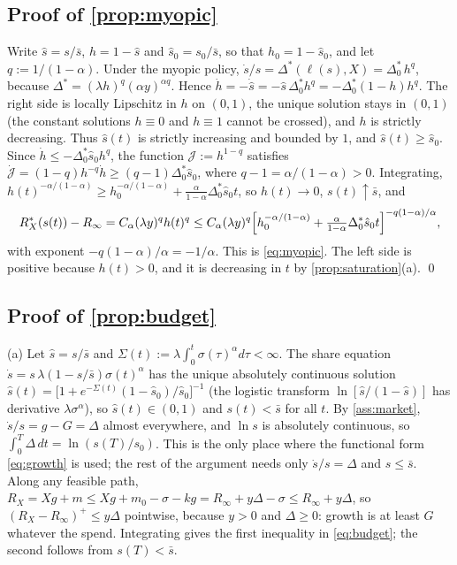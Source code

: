 \subsection*{Proof of \autoref{prop:myopic}}

Write $\hat s=s/\bar s$, $h=1-\hat s$ and $\hat s_0=s_0/\bar s$, so that $h_0=1-\hat s_0$, and let $q:=1/(1-\alpha)$. Under the myopic policy, $\dot s/s=\Delta^*(\ell(s),X)=\Delta_0^*\,h^{q}$, because $\Delta^*=(\lambda h)^{q}(\alpha y)^{\alpha q}$. Hence $\dot h=-\dot{\hat s}=-\hat s\,\Delta_0^*h^{q}=-\Delta_0^*(1-h)h^{q}$. The right side is locally Lipschitz in $h$ on $(0,1)$, the unique solution stays in $(0,1)$ (the constant solutions $h\equiv 0$ and $h\equiv 1$ cannot be crossed), and $h$ is strictly decreasing. Thus $\hat s(t)$ is strictly increasing and bounded by $1$, and $\hat s(t)\ge\hat s_0$. Since $\dot h\le-\Delta_0^*\hat s_0h^{q}$, the function $\mathcal J:=h^{1-q}$ satisfies $\dot{\mathcal J}=(1-q)h^{-q}\dot h\ge(q-1)\Delta_0^*\hat s_0$, where $q-1=\alpha/(1-\alpha)>0$. Integrating, $h(t)^{-\alpha/(1-\alpha)}\ge h_0^{-\alpha/(1-\alpha)}+\tfrac{\alpha}{1-\alpha}\Delta_0^*\hat s_0t$, so $h(t)\to 0$, $s(t)\uparrow\bar s$, and
\[
R_X^*(s(t))-R_\infty=C_\alpha(\lambda y)^{q}h(t)^{q}\le C_\alpha(\lambda y)^{q}\Bigl[h_0^{-\alpha/(1-\alpha)}+\tfrac{\alpha}{1-\alpha}\Delta_0^*\hat s_0t\Bigr]^{-q(1-\alpha)/\alpha},
\]
with exponent $-q(1-\alpha)/\alpha=-1/\alpha$. This is \eqref{eq:myopic}. The left side is positive because $h(t)>0$, and it is decreasing in $t$ by \autoref{prop:saturation}(a). \qed

\subsection*{Proof of \autoref{prop:budget}}

(a) Let $\hat s=s/\bar s$ and $\Sigma(t):=\lambda\int_0^t\sigma(\tau)^{\alpha}d\tau<\infty$. The share equation $\dot s=s\,\lambda(1-s/\bar s)\sigma(t)^{\alpha}$ has the unique absolutely continuous solution $\hat s(t)=\bigl[1+e^{-\Sigma(t)}(1-\hat s_0)/\hat s_0\bigr]^{-1}$ (the logistic transform $\ln[\hat s/(1-\hat s)]$ has derivative $\lambda\sigma^{\alpha}$), so $\hat s(t)\in(0,1)$ and $s(t)<\bar s$ for all $t$. By \autoref{ass:market}, $\dot s/s=g-G=\Delta$ almost everywhere, and $\ln s$ is absolutely continuous, so $\int_0^T\Delta\,dt=\ln(s(T)/s_0)$. This is the only place where the functional form \eqref{eq:growth} is used; the rest of the argument needs only $\dot s/s=\Delta$ and $s\le\bar s$. Along any feasible path, $R_X=Xg+m\le Xg+m_0-\sigma-kg=R_\infty+y\Delta-\sigma\le R_\infty+y\Delta$, so $(R_X-R_\infty)^+\le y\Delta$ pointwise, because $y>0$ and $\Delta\ge0$: growth is at least $G$ whatever the spend. Integrating gives the first inequality in \eqref{eq:budget}; the second follows from $s(T)<\bar s$.

